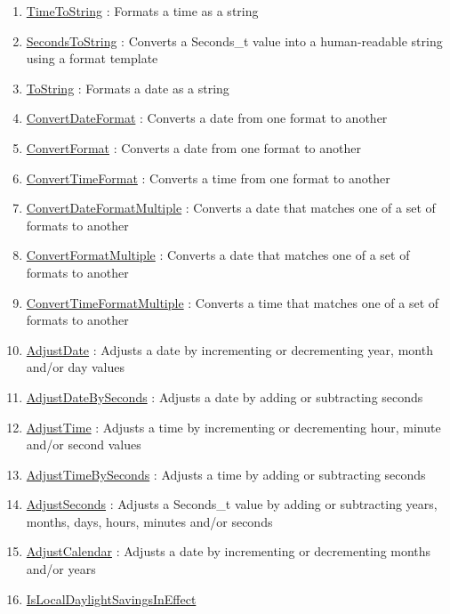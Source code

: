 \begin{enumerate}
\item \hyperlink{ecldoc:date.timetostring}{TimeToString}
: Formats a time as a string
\item \hyperlink{ecldoc:date.secondstostring}{SecondsToString}
: Converts a Seconds\_t value into a human-readable string using a format template
\item \hyperlink{ecldoc:date.tostring}{ToString}
: Formats a date as a string
\item \hyperlink{ecldoc:date.convertdateformat}{ConvertDateFormat}
: Converts a date from one format to another
\item \hyperlink{ecldoc:date.convertformat}{ConvertFormat}
: Converts a date from one format to another
\item \hyperlink{ecldoc:date.converttimeformat}{ConvertTimeFormat}
: Converts a time from one format to another
\item \hyperlink{ecldoc:date.convertdateformatmultiple}{ConvertDateFormatMultiple}
: Converts a date that matches one of a set of formats to another
\item \hyperlink{ecldoc:date.convertformatmultiple}{ConvertFormatMultiple}
: Converts a date that matches one of a set of formats to another
\item \hyperlink{ecldoc:date.converttimeformatmultiple}{ConvertTimeFormatMultiple}
: Converts a time that matches one of a set of formats to another
\item \hyperlink{ecldoc:date.adjustdate}{AdjustDate}
: Adjusts a date by incrementing or decrementing year, month and/or day values
\item \hyperlink{ecldoc:date.adjustdatebyseconds}{AdjustDateBySeconds}
: Adjusts a date by adding or subtracting seconds
\item \hyperlink{ecldoc:date.adjusttime}{AdjustTime}
: Adjusts a time by incrementing or decrementing hour, minute and/or second values
\item \hyperlink{ecldoc:date.adjusttimebyseconds}{AdjustTimeBySeconds}
: Adjusts a time by adding or subtracting seconds
\item \hyperlink{ecldoc:date.adjustseconds}{AdjustSeconds}
: Adjusts a Seconds\_t value by adding or subtracting years, months, days, hours, minutes and/or seconds
\item \hyperlink{ecldoc:date.adjustcalendar}{AdjustCalendar}
: Adjusts a date by incrementing or decrementing months and/or years
\item \hyperlink{ecldoc:date.islocaldaylightsavingsineffect}{IsLocalDaylightSavingsInEffect}

\end{enumerate}
